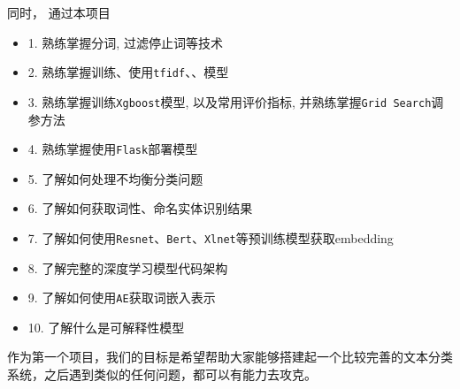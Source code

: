 \noindent 同时， 通过本项目
\begin{itemize}
    \item 1.  熟练掌握分词, 过滤停止词等技术
    \item 2.  熟练掌握训练、使用\texttt{tfidf}、、模型
    \item 3.  熟练掌握训练\texttt{Xgboost}模型, 以及常用评价指标, 并熟练掌握\texttt{Grid Search}调参方法
    \item 4.  熟练掌握使用\texttt{Flask}部署模型
    \item 5.  了解如何处理不均衡分类问题
    \item 6.  了解如何获取词性、命名实体识别结果
    \item 7.  了解如何使用\texttt{Resnet}、\texttt{Bert}、\texttt{Xlnet}等预训练模型获取embedding
    \item 8.  了解完整的深度学习模型代码架构
    \item 9.  了解如何使用\texttt{AE}获取词嵌入表示
    \item 10. 了解什么是可解释性模型
\end{itemize}

\noindent 作为第一个项目，我们的目标是希望帮助大家能够搭建起一个比较完善的文本分类系统，之后遇到类似的任何问题，都可以有能力去攻克。